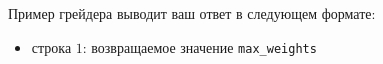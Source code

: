 Пример грейдера выводит ваш ответ в следующем формате:

\begin{itemize}
    \item строка $1$: возвращаемое значение \texttt{max\_weights}
\end{itemize}